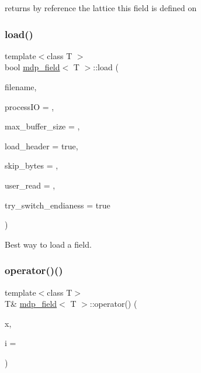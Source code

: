returns by reference the lattice this field is defined on 

\mbox{\label{classmdp__field_a21ce8e89744a826abdc9f5325c714892}} 
\subsubsection{\texorpdfstring{load()}{load()}}
{\footnotesize\ttfamily template$<$class T $>$ \\
bool \hyperlink{classmdp__field}{mdp\+\_\+field}$<$ T $>$\+::load (\begin{DoxyParamCaption}\item[{string}]{filename,  }\item[{int}]{process\+IO = {},  }\item[{\hyperlink{mdp__global__vars_8h_aaa1ad9d0dcd2124aa5af0120d9954174}{mdp\+\_\+int}}]{max\+\_\+buffer\+\_\+size = {},  }\item[{bool}]{load\+\_\+header = {\ttfamily true},  }\item[{\hyperlink{mdp__global__vars_8h_aaa1ad9d0dcd2124aa5af0120d9954174}{mdp\+\_\+int}}]{skip\+\_\+bytes = {},  }\item[{bool($\ast$)(F\+I\+LE $\ast$, void $\ast$, \hyperlink{mdp__global__vars_8h_aaa1ad9d0dcd2124aa5af0120d9954174}{mdp\+\_\+int}, \hyperlink{mdp__global__vars_8h_aaa1ad9d0dcd2124aa5af0120d9954174}{mdp\+\_\+int}, \hyperlink{mdp__global__vars_8h_aaa1ad9d0dcd2124aa5af0120d9954174}{mdp\+\_\+int}, const \hyperlink{classmdp__lattice}{mdp\+\_\+lattice} \&)}]{user\+\_\+read = {},  }\item[{bool}]{try\+\_\+switch\+\_\+endianess = {\ttfamily true} }\end{DoxyParamCaption})}



Best way to load a field. 

\mbox{\label{classmdp__field_a9eec94ee723253a196ccc4677832b4a0}} 
\subsubsection{\texorpdfstring{operator()()}{operator()()}\hspace{0.1cm}{\footnotesize\ttfamily [1/2]}}
{\footnotesize\ttfamily template$<$class T$>$ \\
T\& \hyperlink{classmdp__field}{mdp\+\_\+field}$<$ T $>$\+::operator() (\begin{DoxyParamCaption}\item[{\hyperlink{classmdp__site}{mdp\+\_\+site}}]{x,  }\item[{int}]{i = {} }\end{DoxyParamCaption})\hspace{0.3cm}{\ttfamily [inline]}}



